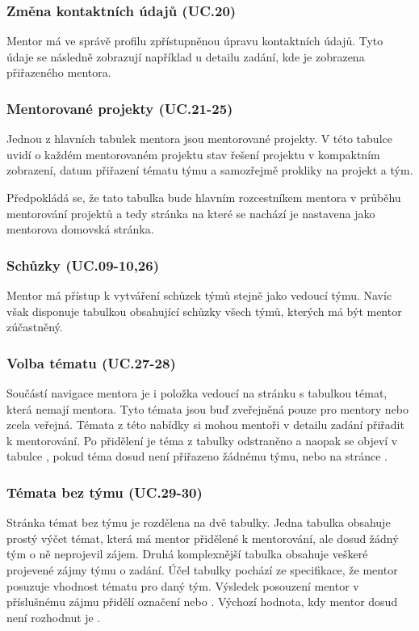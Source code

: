 \documentclass[czech,BP]{thesiskiv}
\begin{document}
			\subsubsection{Změna kontaktních údajů (UC.20)}
				\par Mentor má ve správě profilu zpřístupněnou úpravu kontaktních údajů. Tyto údaje se následně zobrazují například u detailu zadání, kde je zobrazena  přiřazeného mentora.
			\subsubsection{Mentorované projekty (UC.21-25)}
				\par Jednou z hlavních tabulek mentora jsou mentorované projekty. V této tabulce uvidí o každém mentorovaném projektu stav řešení projektu v kompaktním zobrazení, datum přiřazení tématu týmu a samozřejmě prokliky na projekt a tým.
				\par Předpokládá se, že tato tabulka bude hlavním rozcestníkem mentora v průběhu mentorování projektů a tedy stránka na které se nachází je nastavena jako mentorova domovská stránka.
			\subsubsection{Schůzky (UC.09-10,26)}
				\par Mentor má přístup k vytváření schůzek týmů stejně jako vedoucí týmu. Navíc však disponuje tabulkou obsahující schůzky všech týmů, kterých má být mentor zúčastněný.
			\subsubsection{Volba tématu (UC.27-28)}
				\par Součástí navigace mentora je i položka  vedoucí na stránku s tabulkou témat, která nemají mentora. Tyto témata jsou buď zveřejněná pouze pro mentory nebo zcela veřejná. Témata z této nabídky si mohou mentoři v detailu zadání přiřadit k mentorování. Po přidělení je téma z tabulky odstraněno a naopak se objeví v tabulce , pokud téma dosud není přiřazeno žádnému týmu, nebo na stránce .
			\subsubsection{Témata bez týmu (UC.29-30)}
				\par Stránka témat bez týmu je rozdělena na dvě tabulky. Jedna tabulka obsahuje prostý výčet témat, která má mentor přidělené k mentorování, ale dosud žádný tým o ně neprojevil zájem. Druhá komplexnější tabulka obsahuje veškeré projevené zájmy týmu o zadání. Účel tabulky pochází ze specifikace, že mentor posuzuje vhodnost tématu pro daný tým. Výsledek posouzení mentor v příslušnému zájmu přidělí označení  nebo . Výchozí hodnota, kdy mentor dosud není rozhodnut je .
\end{document}

